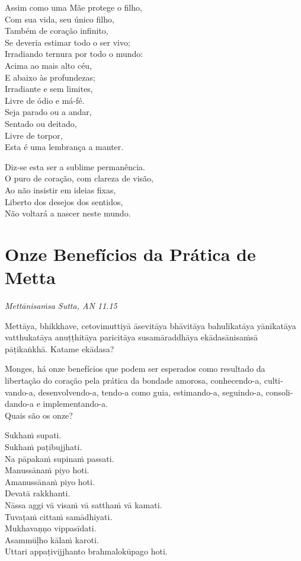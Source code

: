 Assim como uma Mãe protege o filho,\\
Com sua vida, seu único filho,\\
Também de coração infinito,\\
Se deveria estimar todo o ser vivo;\\
Irradiando ternura por todo o mundo:\\
Acima ao mais alto céu,\\
E abaixo às profundezas;\\
Irradiante e sem limites,\\
Livre de ódio e má-fé.\\
Seja parado ou a andar,\\
Sentado ou deitado,\\
Livre de torpor,\\
Esta é uma lembrança a manter.

Diz-se esta ser a sublime permanência.\\
O puro de coração, com clareza de visão,\\
Ao não insistir em ideias fixas,\\
Liberto dos desejos dos sentidos,\\
Não voltará a nascer neste mundo.

\chapter[Onze Benefícios]{Onze Benefícios da Prática de Metta}

\emph{Mettānisaṁsa Sutta, AN 11.15}


\begin{leader}
\end{leader}

Mettāya, bhikkhave, cetovimuttiyā āsevitāya bhāvitāya bahulīkatāya yānīkatāya vatthukatāya anuṭṭhitāya paricitāya susamāraddhāya ekādasānisaṁsā pāṭikaṅkhā. Katame ekādasa?

\begin{english}
  Monges, há onze benefícios que podem ser esperados como resultado da libertação do coração pela prática da bondade amorosa, conhecendo-a, cultivando-a, desenvolvendo-a, tendo-a como guia, estimando-a, seguindo-a, consolidando-a e implementando-a.\\
  Quais são os onze?
\end{english}

Sukhaṁ supati.\\
Sukhaṁ paṭibujjhati.\\
Na pāpakaṁ supinaṁ passati.\\
Manussānaṁ piyo hoti.\\
Amanussānaṁ piyo hoti.\\
Devatā rakkhanti.\\
Nāssa aggi vā visaṁ vā satthaṁ vā kamati.\\
Tuvaṭaṁ cittaṁ samādhiyati.\\
Mukhavaṇṇo vippasīdati.\\
Asammūḷho kālaṁ karoti.\\
Uttari appaṭivijjhanto brahmalokūpago hoti.

